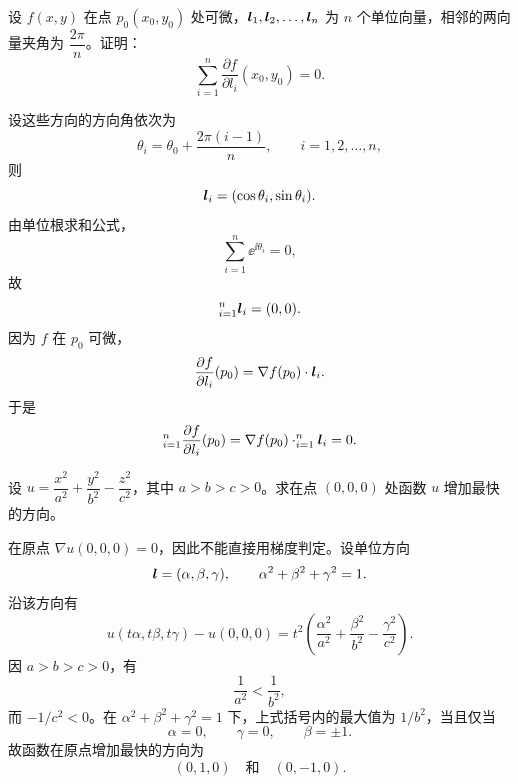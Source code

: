 \begin{xexercise}[4]
设 $f(x,y)$ 在点 $p_0(x_0,y_0)$ 处可微，$\bm{l}_1,\bm{l}_2,\ldots,\bm{l}_n$ 为 $n$ 个单位向量，相邻的两向量夹角为 $\dfrac{2\pi}{n}$。证明：
  \[
    \sum_{i=1}^n\frac{\partial f}{\partial l_i}(x_0,y_0)=0.
  \]
\end{xexercise}
\begin{xsolution}
设这些方向的方向角依次为
\[
  \theta_i=\theta_0+\frac{2\pi(i-1)}n,
  \qquad i=1,2,\ldots,n,
\]
则
\[
  \bm{l}_i=(\cos\theta_i,\sin\theta_i).
\]
由单位根求和公式，
\[
  \sum_{i=1}^n\ee^{\ii\theta_i}=0,
\]
故
\[
  \relax_{i=1}^n\bm{l}_i=(0,0).
\]
因为 $f$ 在 $p_0$ 可微，
\[
  \frac{\partial f}{\partial l_i}(p_0)
  =\nabla f(p_0)\cdot\bm{l}_i.
\]
于是
\[
  \relax_{i=1}^n\frac{\partial f}{\partial l_i}(p_0)
  =\nabla f(p_0)\cdot\relax_{i=1}^n\bm{l}_i=0.
\]
\end{xsolution}


\begin{xexercise}[5]
设 $u=\dfrac{x^2}{a^2}+\dfrac{y^2}{b^2}-\dfrac{z^2}{c^2}$，其中 $a>b>c>0$。求在点 $(0,0,0)$ 处函数 $u$ 增加最快的方向。
\end{xexercise}
\begin{xsolution}
在原点 $\nabla u(0,0,0)=0$，因此不能直接用梯度判定。设单位方向
\[
  \bm{l}=(\alpha,\beta,\gamma),
  \qquad
  \alpha^2+\beta^2+\gamma^2=1.
\]
沿该方向有
\[
  u(t\alpha,t\beta,t\gamma)-u(0,0,0)
  =t^2\left(
  \frac{\alpha^2}{a^2}+\frac{\beta^2}{b^2}-\frac{\gamma^2}{c^2}
  \right).
\]
因 $a>b>c>0$，有
\[
  \frac1{a^2}<\frac1{b^2},
\]
而 $-1/c^2<0$。在 $\alpha^2+\beta^2+\gamma^2=1$ 下，上式括号内的最大值为 $1/b^2$，当且仅当
\[
  \alpha=0,\qquad \gamma=0,\qquad \beta=\pm1.
\]
故函数在原点增加最快的方向为
\[
  (0,1,0)\quad\text{和}\quad(0,-1,0).
\]
\end{xsolution}


